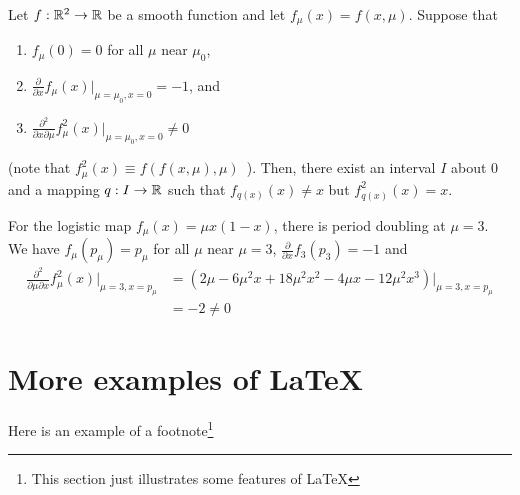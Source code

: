 \begin{theo}
Let $f:\mathbb{R}^2 \rightarrow \mathbb{R}$ be a smooth function and let
$f_\mu(x)= f(x,\mu)$.  Suppose that
\begin{enumerate}
\item $f_{\mu}(0)=0$ for all $\mu$ near $\mu_0$,
\item $\displaystyle \frac{\partial}{\partial x}
f_{\mu}(x)\bigg|_{\mu=\mu_0,x=0} = -1$,
and
\item $\displaystyle \frac{\partial^2}{\partial x \partial \mu}
f_{\mu}^2(x)\bigg|_{\mu=\mu_0,x=0} \not=0$
\end{enumerate}
(note that $f^2_\mu(x) \equiv f(f(x,\mu),\mu)$\ ).  Then, there exist
an interval $I$ about $0$ and a mapping $q:I\rightarrow \mathbb{R}$ such that
$f_{q(x)}(x) \neq x$ but $f^2_{q(x)}(x) = x$.
\end{theo}

\begin{egg}
For the logistic map $f_\mu(x) = \mu x(1-x)$, there is period doubling
at $\mu=3$.  We have
$f_\mu(p_\mu) = p_\mu$ for all $\mu$ near $\mu=3$,
$\displaystyle \frac{\partial}{\partial x} f_3(p_3) = -1$ and
\begin{align*}
\frac{\partial^2}{\partial \mu \partial x} f_\mu^2(x) \big|_{\mu=3,x=p_\mu} &=
\left( 2\mu - 6\mu^2 x+18\mu^2 x^2 - 4\mu x -
12\mu^2 x^3\right)\big|_{\mu=3,x=p_\mu} \\
&= -2 \not=0
\end{align*}
\end{egg}

\section{More examples of \LaTeX}

Here is an example of a footnote\footnote{This section just illustrates
some features of \LaTeX}

